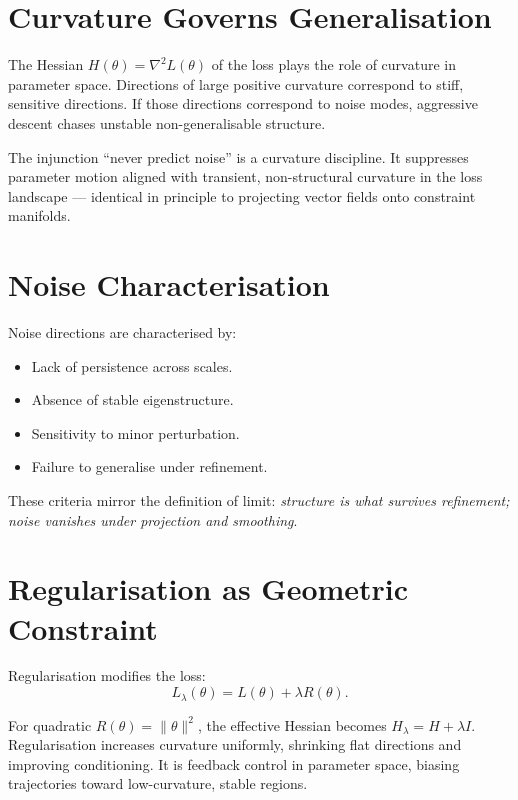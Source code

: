 \documentclass[12pt,openany]{book}
\begin{document}
\section{Curvature Governs Generalisation}

The Hessian $H(\theta)=\nabla^2 L(\theta)$ of the loss plays the role of
curvature in parameter space. Directions of large positive curvature correspond
to stiff, sensitive directions. If those directions correspond to noise modes,
aggressive descent chases unstable non-generalisable structure.

\begin{insight}
  The injunction ``never predict noise'' is a curvature discipline. It
  suppresses parameter motion aligned with transient, non-structural curvature
  in the loss landscape — identical in principle to projecting vector fields
  onto constraint manifolds.
\end{insight}

\section{Noise Characterisation}

Noise directions are characterised by:
\begin{itemize}[leftmargin=1.5em]
  \item Lack of persistence across scales.
  \item Absence of stable eigenstructure.
  \item Sensitivity to minor perturbation.
  \item Failure to generalise under refinement.
\end{itemize}

These criteria mirror the definition of limit: \emph{structure is what
survives refinement; noise vanishes under projection and smoothing}.

\section{Regularisation as Geometric Constraint}

Regularisation modifies the loss:
\[
  L_\lambda(\theta) = L(\theta) + \lambda R(\theta).
\]

For quadratic $R(\theta)=\|\theta\|^2$, the effective Hessian becomes
$H_\lambda = H + \lambda I$. Regularisation increases curvature uniformly,
shrinking flat directions and improving conditioning. It is feedback control in
parameter space, biasing trajectories toward low-curvature, stable regions.
\end{document}
